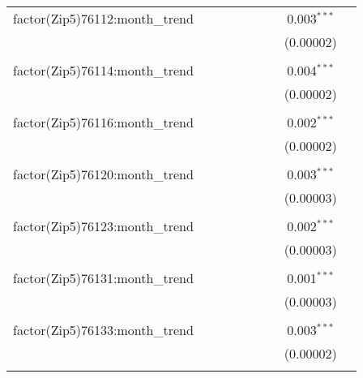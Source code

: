 \begin{table}[H]
{\begin{tabular}{@{\extracolsep{5pt}}lcccccccc}
  factor(Zip5)76112:month\_trend &  &  &  &  &  &  & 0.003$^{***}$ &  \\  

   &  &  &  &  &  &  & (0.00002) &  \\  

   & & & & & & & & \\  

  factor(Zip5)76114:month\_trend &  &  &  &  &  &  & 0.004$^{***}$ &  \\  

   &  &  &  &  &  &  & (0.00002) &  \\  

   & & & & & & & & \\  

  factor(Zip5)76116:month\_trend &  &  &  &  &  &  & 0.002$^{***}$ &  \\  

   &  &  &  &  &  &  & (0.00002) &  \\  

   & & & & & & & & \\  

  factor(Zip5)76120:month\_trend &  &  &  &  &  &  & 0.003$^{***}$ &  \\  

   &  &  &  &  &  &  & (0.00003) &  \\  

   & & & & & & & & \\  

  factor(Zip5)76123:month\_trend &  &  &  &  &  &  & 0.002$^{***}$ &  \\  

   &  &  &  &  &  &  & (0.00003) &  \\  

   & & & & & & & & \\  

  factor(Zip5)76131:month\_trend &  &  &  &  &  &  & 0.001$^{***}$ &  \\  

   &  &  &  &  &  &  & (0.00003) &  \\  

   & & & & & & & & \\  

  factor(Zip5)76133:month\_trend &  &  &  &  &  &  & 0.003$^{***}$ &  \\  

   &  &  &  &  &  &  & (0.00002) &  \\  

   & & & & & & & & \\  


\end{tabular}}
\end{table}
